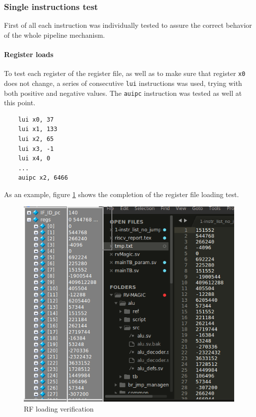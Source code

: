 \documentclass[a4paper]{article}
\begin{document}
\subsubsection{Single instructions test}
First of all each instruction was individually tested to assure the correct behavior of the whole pipeline mechanism.

\paragraph{Register loads}
To test each register of the register file, as well as to make sure that register \texttt{x0} does not change, a series of consecutive \texttt{lui} instructions was used, trying with both positive and negative values.
The \texttt{auipc} instruction was tested as well at this point.

\begin{verbatim}
    lui x0, 37
    lui x1, 133
    lui x2, 65
    lui x3, -1
    lui x4, 0
    ...
    auipc x2, 6466
\end{verbatim}

As an example, figure \ref{fig:first_LUIs_ver} shows the completion of the register file loading test.

\begin{figure}[hbtp]
    \centering
    \includegraphics[scale=.5]{../report/img/first_LUIs_validation.png}
    \caption{RF loading verification}
    \label{fig:first_LUIs_ver}
\end{figure}
\end{document}

